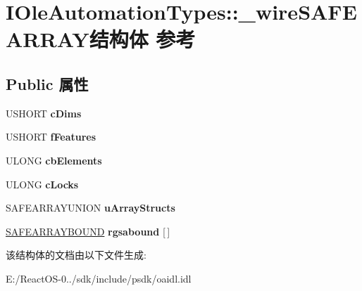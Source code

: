 \hypertarget{struct_i_ole_automation_types_1_1__wire_s_a_f_e_a_r_r_a_y}{}\section{I\+Ole\+Automation\+Types\+:\+:\+\_\+wire\+S\+A\+F\+E\+A\+R\+R\+A\+Y结构体 参考}
\label{struct_i_ole_automation_types_1_1__wire_s_a_f_e_a_r_r_a_y}
\subsection*{Public 属性}
\begin{DoxyCompactItemize}
\item 
\mbox{\label{struct_i_ole_automation_types_1_1__wire_s_a_f_e_a_r_r_a_y_afc542b4ac968d460c1aa72152e90de1f}} 
U\+S\+H\+O\+RT {\bfseries c\+Dims}
\item 
\mbox{\label{struct_i_ole_automation_types_1_1__wire_s_a_f_e_a_r_r_a_y_a541dec4cca2bf8ac2739344d29c68803}} 
U\+S\+H\+O\+RT {\bfseries f\+Features}
\item 
\mbox{\label{struct_i_ole_automation_types_1_1__wire_s_a_f_e_a_r_r_a_y_a88443488025e5a8e6da98889bbf0392e}} 
U\+L\+O\+NG {\bfseries cb\+Elements}
\item 
\mbox{\label{struct_i_ole_automation_types_1_1__wire_s_a_f_e_a_r_r_a_y_a3f67fa5d681b18fe4b4f3ee0ca4a6b41}} 
U\+L\+O\+NG {\bfseries c\+Locks}
\item 
\mbox{\label{struct_i_ole_automation_types_1_1__wire_s_a_f_e_a_r_r_a_y_a5ca918925bf344d1dfce7cce20541b96}} 
S\+A\+F\+E\+A\+R\+R\+A\+Y\+U\+N\+I\+ON {\bfseries u\+Array\+Structs}
\item 
\mbox{\label{struct_i_ole_automation_types_1_1__wire_s_a_f_e_a_r_r_a_y_ae1b030c698030b8c7fd9350bafc59ca7}} 
\hyperlink{struct_i_ole_automation_types_1_1tag_s_a_f_e_a_r_r_a_y_b_o_u_n_d}{S\+A\+F\+E\+A\+R\+R\+A\+Y\+B\+O\+U\+ND} {\bfseries rgsabound} \mbox{[}$\,$\mbox{]}
\end{DoxyCompactItemize}


该结构体的文档由以下文件生成\+:\begin{DoxyCompactItemize}
\item 
E\+:/\+React\+O\+S-\/0../sdk/include/psdk/oaidl.\+idl\end{DoxyCompactItemize}
